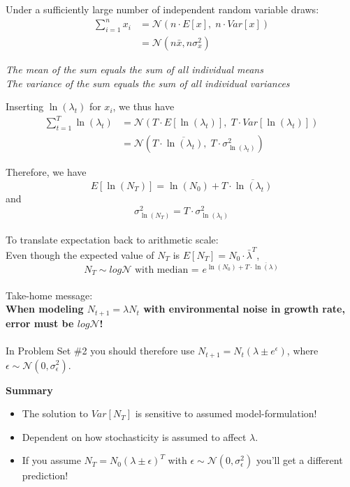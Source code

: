 \documentclass{article}
\begin{document}
Under a sufficiently large number of independent random variable draws:
\begin{align*}
	\boxed{\sum_{i=1}^n x_i} & = \mathcal{N}(n\cdot E[x] , \; n\cdot Var[x])\\
	& = \mathcal{N}(n \bar{x}, n \sigma_{x}^2)
\end{align*}

\begin{center}
\emph{The mean of the sum equals the sum of all individual means}\\
\emph{The variance of the sum equals the sum of all individual variances}\\
\end{center}
Inserting $\ln (\lambda_t)$ for $x_i$, we thus have
\begin{align*}
	\sum_{t=1}^T \ln (\lambda_t) & =  \mathcal{N}(T\cdot E[\ln(\lambda_t)] , \; T\cdot Var[\ln(\lambda_t)])\\
	& = \mathcal{N}(T\cdot \overline{\ln(\lambda_t)},\; T\cdot\sigma_{\ln (\lambda_t)}^2)
\end{align*}

Therefore, we have
\begin{equation*}
	E[\ln(N_T)]=\ln(N_0)+ T \cdot \overline{\ln(\lambda_t)}
\end{equation*}
and
\begin{equation*}
\sigma_{\ln (N_T)}^2 = T\cdot \sigma_{\ln(\lambda_t)}^2
\end{equation*}
\\
To translate expectation back to arithmetic scale:\\
Even though the expected value of $N_T$ is $E[N_T]= N_0 \cdot \bar{\lambda}^T$,
\begin{equation*}
	N_T \sim log\mathcal{N} \text{ with median = } e^{\ln(N_0)+T\cdot \overline{\ln(\lambda)}}
\end{equation*}
\\
Take-home message:\\
\textbf{When modeling $N_{t+1}=\lambda N_t$ with environmental noise in growth rate, error must be $log\mathcal{N}$!}\\
\\
In Problem Set \#2 you should therefore use $N_{t+1}=N_t (\lambda \pm e^\epsilon)$, where $\epsilon \sim \mathcal{N}(0,\sigma_\epsilon^2)$.\\

\pagebreak

\textbf{Summary}
\begin{itemize}
\item The solution to $Var[N_T]$ is sensitive to assumed model-formulation!
\item Dependent on how stochasticity is assumed to affect $\lambda$.
\item If you assume $N_{T}=N_0 (\lambda \pm \epsilon)^T$ with $\epsilon \sim \mathcal{N}(0,\sigma_\epsilon^2)$ you'll get a different prediction!
\end{itemize}
\end{document}

